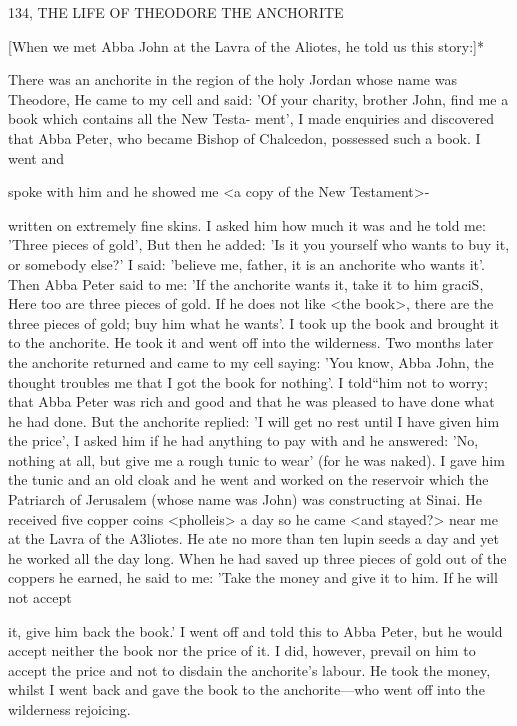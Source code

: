 134, THE LIFE OF THEODORE THE ANCHORITE

[When we met Abba John at the Lavra of the Aliotes, he told us
this story:]*

There was an anchorite in the region of the holy Jordan whose
name was Theodore, He came to my cell and said: 'Of your charity,
brother John, find me a book which contains all the New Testa-
ment', I made enquiries and discovered that Abba Peter, who
became Bishop of Chalcedon, possessed such a book.
I went and

spoke with him and he showed me <a copy of the New Testament>-

written on extremely fine skins.
I asked him how much it was and
he told me: 'Three pieces of gold', But then he added: 'Is it you
yourself who wants to buy it, or somebody else?' I said: 'believe me,
father, it is an anchorite who wants it'.
Then Abba Peter said to me:
'If the anchorite wants it, take it to him graciS, Here too are three
pieces of gold.
If he does not like <the book>, there are the three
pieces of gold; buy him what he wants'.
I took up the book and
brought it to the anchorite.
He took it and went off into the
wilderness.
Two months later the anchorite returned and came to
my cell saying: 'You know, Abba John, the thought troubles me
that I got the book for nothing'.
I told“him not to worry; that Abba
Peter was rich and good and that he was pleased to have done what
he had done.
But the anchorite replied: 'I will get no rest until I
have given him the price', I asked him if he had anything to pay
with and he answered: 'No, nothing at all, but give me a rough
tunic to wear' (for he was naked).
I gave him the tunic and an old
cloak and he went and worked on the reservoir which the Patriarch
of Jerusalem (whose name was John) was constructing at Sinai.
He
received five copper coins <pholleis> a day so he came <and
stayed?> near me at the Lavra of the A3liotes.
He ate no more than
ten lupin seeds a day and yet he worked all the day long.
When he
had saved up three pieces of gold out of the coppers he earned, he
said to me: 'Take the money and give it to him.
If he will not accept

it, give him back the book.' I went off and told this to Abba Peter,
but he would accept neither the book nor the price of it.
I did,
however, prevail on him to accept the price and not to disdain the
anchorite's labour.
He took the money, whilst I went back and gave
the book to the anchorite—who went off into the wilderness
rejoicing.

